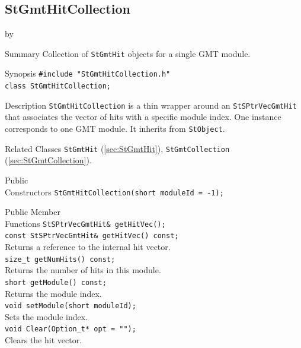 \documentclass[twoside]{article}
\newcommand{\entrylabel}[1]{\mbox{\textbf{{#1}}}\hfil}%
\newenvironment{entry}
{\begin{list}{}%
    {\renewcommand{\makelabel}{\entrylabel}%
     \setlength{\labelwidth}{90pt}%
     \setlength{\leftmargin}{\labelwidth}
     \advance\leftmargin by \labelsep%
      }%
    }%
  {\end{list}}
\newcommand{\Entrylabel}[1]%
{\raisebox{0pt}[1ex][0pt]{\makebox[\labelwidth][l]%
    {\parbox[t]{\labelwidth}{\hspace{0pt}\textbf{{#1}}}}}}
\newenvironment{Entry}%
{\renewcommand{\entrylabel}{\Entrylabel}\begin{entry}}%
  {\end{entry}}
\begin{document}
\subsection{StGmtHitCollection}
\label{sec:StGmtHitCollection}
\begin{Entry}
\item[Summary] Collection of \texttt{StGmtHit} objects for a single GMT module.
\item[Synopsis]
    \verb+#include "StGmtHitCollection.h"+\\
    \verb+class StGmtHitCollection;+\\
\item[Description]
    \texttt{StGmtHitCollection} is a thin wrapper around an
    \texttt{StSPtrVecGmtHit} that associates the vector of hits with a
    specific module index.  One instance corresponds to one GMT module.
    It inherits from \texttt{StObject}.
\item[Related Classes]
    \texttt{StGmtHit} (\ref{sec:StGmtHit}),
    \texttt{StGmtCollection} (\ref{sec:StGmtCollection}).
\item[Public\\ Constructors]
    \verb+StGmtHitCollection(short moduleId = -1);+\\
\item[Public Member\\ Functions]
    \verb+StSPtrVecGmtHit& getHitVec();+\\
    \verb+const StSPtrVecGmtHit& getHitVec() const;+\\
    Returns a reference to the internal hit vector.\\
    \verb+size_t getNumHits() const;+\\
    Returns the number of hits in this module.\\
    \verb+short getModule() const;+\\
    Returns the module index.\\
    \verb+void setModule(short moduleId);+\\
    Sets the module index.\\
    \verb+void Clear(Option_t* opt = "");+\\
    Clears the hit vector.\\
\end{Entry}
\clearpage

\end{document}
